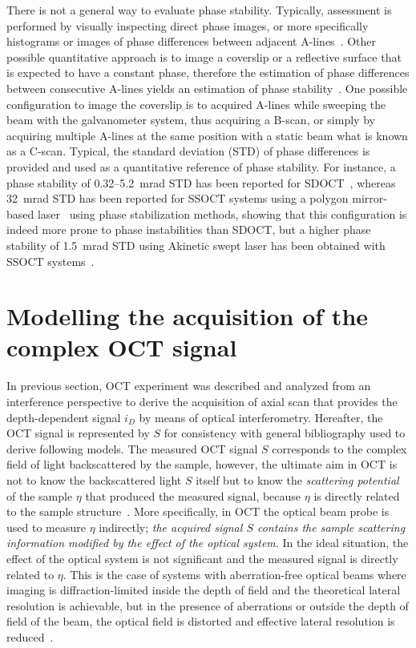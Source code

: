 There is not a general way to evaluate phase stability. Typically, assessment is performed by visually inspecting direct phase images, or more specifically histograms or images of phase differences between adjacent A-lines~\cite{Minneman2015_Akinetik}. Other possible quantitative approach is to image a coverslip or a reflective surface that is expected to have a constant phase, therefore the estimation of phase differences between consecutive A-lines yields an estimation of phase stability~\cite{Minneman2015_Akinetik}. One possible configuration to image the coverslip is to acquired A-lines while sweeping the beam with the galvanometer system, thus acquiring a B-scan, or simply by acquiring multiple A-lines at the same position with a static beam what is known as a C-scan. Typical, the standard deviation (STD) of phase differences is provided and used as a quantitative reference of phase stability. For instance, a phase stability of 0.32–5.2~mrad STD has been reported for SDOCT~\cite{White2003_vivo, Joo2005_Spectraldomain}, whereas 32~mrad STD has been reported for SSOCT systems using a polygon mirror-based laser~\cite{Manapuram2009_Phasesensitive} using phase stabilization methods, showing that this configuration is indeed more prone to phase instabilities than SDOCT, but a higher phase stability of 1.5~mrad STD using Akinetic swept laser has been obtained with SSOCT systems~\cite{Choi2013_Phasesensitive}.

\section{Modelling the acquisition of the complex OCT signal}\label{Model}

In previous section, OCT experiment was described and analyzed from an interference perspective to derive the acquisition of axial scan that provides the depth-dependent signal $i_D$ by means of optical interferometry. Hereafter, the OCT signal is represented by $S$ for consistency with general bibliography used to derive following models. The measured OCT signal $S$ corresponds to the complex field of light backscattered by the sample, however, the ultimate aim in OCT is not to know the backscattered light $S$ itself but to know the \textit{scattering potential} of the sample $\eta$ that produced the measured signal, because $\eta$ is directly related to the sample structure~\cite{Ralston2006_Inverse}. More specifically, in OCT the optical beam probe is used to measure $\eta$ indirectly; \textit{the acquired signal $S$ contains the sample scattering information modified by the effect of the optical system}. In the ideal situation, the effect of the optical system is not significant and the measured signal is directly related to $\eta$. This is the case of systems with aberration-free optical beams where imaging is diffraction-limited inside the depth of field and the theoretical lateral resolution is achievable, but in the presence of aberrations or outside the depth of field of the beam, the optical field is distorted and effective lateral resolution is reduced~\cite{Ralston2006_Inverse}.

